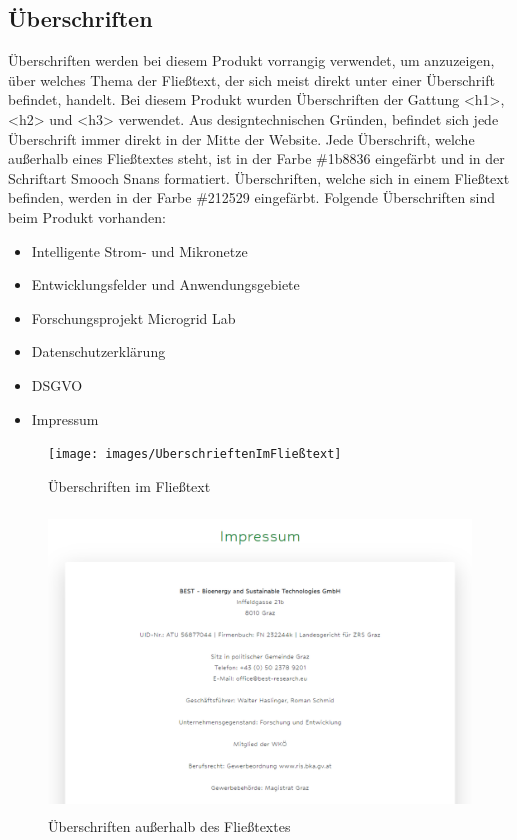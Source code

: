 \subsection{Überschriften}
Überschriften werden bei diesem Produkt vorrangig verwendet, um anzuzeigen, über welches Thema der Fließtext, der sich meist direkt unter einer Überschrift befindet, handelt. Bei diesem Produkt wurden Überschriften der Gattung <h1>, <h2> und <h3> verwendet. Aus designtechnischen Gründen, befindet sich jede Überschrift immer direkt in der Mitte der Website. Jede Überschrift, welche außerhalb eines Fließtextes steht, ist in der Farbe \glqq \#1b8836 \grqq eingefärbt und in der Schriftart \glqq Smooch Snans \grqq formatiert. Überschriften, welche sich in einem Fließtext befinden, werden in der Farbe \glqq \#212529 \grqq eingefärbt. Folgende Überschriften sind beim Produkt vorhanden: 
\begin{itemize}
	\item Intelligente Strom- und Mikronetze
	\item Entwicklungsfelder und Anwendungsgebiete
	\item Forschungsprojekt Microgrid Lab
	\item Datenschutzerklärung
	\item DSGVO
	\item Impressum
\end{itemize}
\newpage
\begin{figure}[h]
	\centering
	\texttt{[image: images/UberschrieftenImFließtext]}
	\caption{Überschriften im Fließtext}
	\label{fig: Überschriften im Fließtext}
\end{figure}
\begin{figure}[h]
	\centering
	\includegraphics[height=8cm,width=14cm]{images/ImpressumUberschrift}
	\caption{Überschriften außerhalb des Fließtextes}
	\label{fig: Überschriften außerhalb des Fließtextes}
\end{figure}
\newpage

